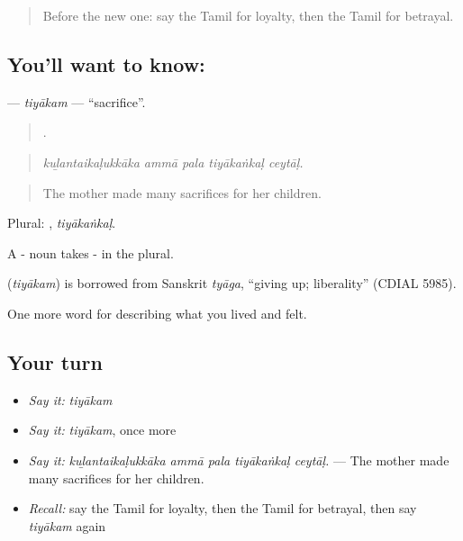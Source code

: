 \label{lesson:TA-C470-tiyakam}



\begin{quote}
Before the new one: say the Tamil for loyalty, then the Tamil for betrayal.
\end{quote}

\subsection*{You'll want to know: }
\textbf{} — \emph{tiyākam} — \textquotedblleft{}sacrifice\textquotedblright{}.

\begin{quote}
    .
\end{quote}

\begin{quote}
\emph{kuḻantaikaḷukkāka ammā pala tiyākaṅkaḷ ceytāḷ.}
\end{quote}

\begin{quote}
The mother made many sacrifices for her children.
\end{quote}

Plural: , \emph{tiyākaṅkaḷ}.

A - noun takes - in the plural.

\begin{cousinweb}
\textbf{} (\emph{tiyākam}) is borrowed from Sanskrit \emph{tyāga}, \textquotedblleft{}giving up; liberality\textquotedblright{} (CDIAL 5985).
\end{cousinweb}

\begin{grammarlens}[title={What you've built}]
One more word for describing what you lived and felt.
\end{grammarlens}

\subsection*{Your turn}
\begin{itemize}
\raggedright
  \item \emph{Say it:} \emph{tiyākam}
  \item \emph{Say it:} \emph{tiyākam}, once more
  \item \emph{Say it:} \emph{kuḻantaikaḷukkāka ammā pala tiyākaṅkaḷ ceytāḷ.} — The mother made many sacrifices for her children.
  \item \emph{Recall:} say the Tamil for loyalty, then the Tamil for betrayal, then say \emph{tiyākam} again
\end{itemize}

